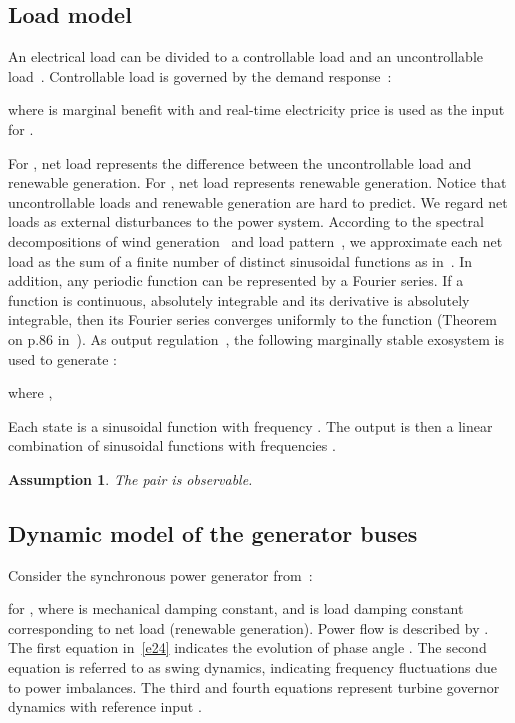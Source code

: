 \documentclass[journal]{IEEEtran}
\newtheorem{assumption}{\bf Assumption}[section]
\begin{document}
\subsection{Load model}
An electrical load can be divided to a controllable load and an uncontrollable load~\cite{alvarado1999stability,Alvarado.Meng.ea:01,chiu2013energy}.
Controllable load  is governed by the demand response~\cite{Alvarado.Meng.ea:01}:

where  is marginal benefit with  and real-time electricity price  is used as the input for .



For , net load  represents the difference between the uncontrollable load and renewable generation. For , net load  represents renewable generation.
Notice that uncontrollable loads and renewable generation are hard to predict.
We regard net loads  as external disturbances to the power system.
According to the spectral decompositions of wind generation~\cite{milan2013turbulent,van1957power} and load pattern~\cite{aguirre2008dynamical}, we approximate each net load as the sum of a finite number of distinct sinusoidal functions as in~\cite{trip2016internal}.
In addition, any periodic function can be represented by a Fourier series.
If a function is continuous, absolutely integrable and its derivative is absolutely integrable, then its Fourier series converges uniformly to the function (Theorem on p.86 in~\cite{tolstov2012fourier}).
As output regulation~\cite{francis1975internal,isidori1990output}, the following marginally stable exosystem is used to generate :

where ,

Each state  is a sinusoidal function with frequency . The output  is then a linear combination of sinusoidal functions with frequencies .
\begin{assumption}
The pair  is observable.\label{asmp3}
\end{assumption}

\subsection{Dynamic model of the generator buses}\label{sec:gen0}
Consider the synchronous power generator from~\cite{Wood:1996}:

for , where  is mechanical damping constant, and  is load damping constant corresponding to net load (renewable generation).
Power flow  is described by .
The first equation in~\eqref{e24} indicates the evolution of phase angle .
The second equation is referred to as swing dynamics, indicating frequency fluctuations due to power imbalances.
The third and fourth equations represent turbine governor dynamics with reference input .
\end{document}
